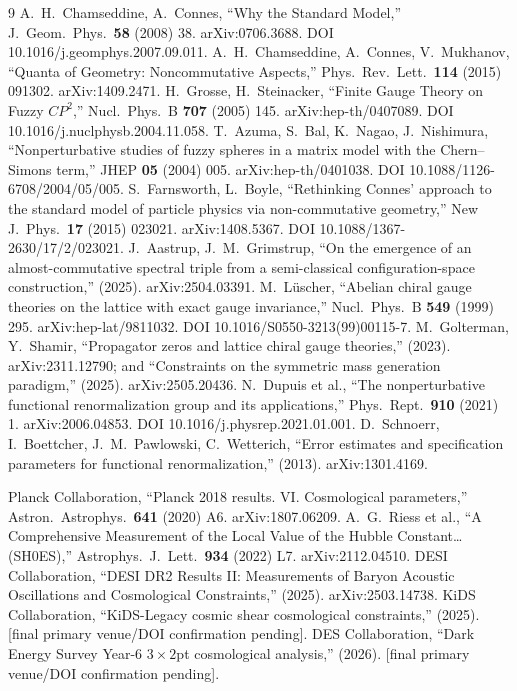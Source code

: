 \documentclass[12pt,a4paper,twoside]{article}
\theoremstyle{plain}
\theoremstyle{definition}
\theoremstyle{remark}
\begin{document}
\begin{thebibliography}{9}
A.~H.~Chamseddine, A.~Connes, ``Why the Standard Model,'' J.\ Geom.\ Phys.\ \textbf{58} (2008) 38. arXiv:0706.3688. DOI 10.1016/j.geomphys.2007.09.011.
A.~H.~Chamseddine, A.~Connes, V.~Mukhanov, ``Quanta of Geometry: Noncommutative Aspects,'' Phys.\ Rev.\ Lett.\ \textbf{114} (2015) 091302. arXiv:1409.2471.
H.~Grosse, H.~Steinacker, ``Finite Gauge Theory on Fuzzy $CP^2$,'' Nucl.\ Phys.\ B \textbf{707} (2005) 145. arXiv:hep-th/0407089. DOI 10.1016/j.nuclphysb.2004.11.058.
T.~Azuma, S.~Bal, K.~Nagao, J.~Nishimura, ``Nonperturbative studies of fuzzy spheres in a matrix model with the Chern--Simons term,'' JHEP \textbf{05} (2004) 005. arXiv:hep-th/0401038. DOI 10.1088/1126-6708/2004/05/005.
S.~Farnsworth, L.~Boyle, ``Rethinking Connes' approach to the standard model of particle physics via non-commutative geometry,'' New J.\ Phys.\ \textbf{17} (2015) 023021. arXiv:1408.5367. DOI 10.1088/1367-2630/17/2/023021.
J.~Aastrup, J.~M.~Grimstrup, ``On the emergence of an almost-commutative spectral triple from a semi-classical configuration-space construction,'' (2025). arXiv:2504.03391.
M.~L\"uscher, ``Abelian chiral gauge theories on the lattice with exact gauge invariance,'' Nucl.\ Phys.\ B \textbf{549} (1999) 295. arXiv:hep-lat/9811032. DOI 10.1016/S0550-3213(99)00115-7.
M.~Golterman, Y.~Shamir, ``Propagator zeros and lattice chiral gauge theories,'' (2023). arXiv:2311.12790; and ``Constraints on the symmetric mass generation paradigm,'' (2025). arXiv:2505.20436.
N.~Dupuis et al., ``The nonperturbative functional renormalization group and its applications,'' Phys.\ Rept.\ \textbf{910} (2021) 1. arXiv:2006.04853. DOI 10.1016/j.physrep.2021.01.001.
D.~Schnoerr, I.~Boettcher, J.~M.~Pawlowski, C.~Wetterich, ``Error estimates and specification parameters for functional renormalization,'' (2013). arXiv:1301.4169.

Planck Collaboration, ``Planck 2018 results. VI. Cosmological parameters,'' Astron.\ Astrophys.\ \textbf{641} (2020) A6. arXiv:1807.06209.
A.~G.~Riess et al., ``A Comprehensive Measurement of the Local Value of the Hubble Constant\ldots (SH0ES),'' Astrophys.\ J.\ Lett.\ \textbf{934} (2022) L7. arXiv:2112.04510.
DESI Collaboration, ``DESI DR2 Results II: Measurements of Baryon Acoustic Oscillations and Cosmological Constraints,'' (2025). arXiv:2503.14738.
KiDS Collaboration, ``KiDS-Legacy cosmic shear cosmological constraints,'' (2025). [final primary venue/DOI confirmation pending].
DES Collaboration, ``Dark Energy Survey Year-6 $3\times2$pt cosmological analysis,'' (2026). [final primary venue/DOI confirmation pending].

\end{thebibliography}
\end{document}

